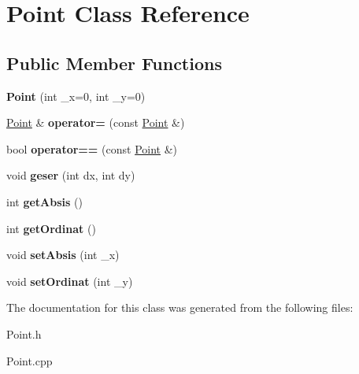 \hypertarget{class_point}{}\section{Point Class Reference}
\label{class_point}
\subsection*{Public Member Functions}
\begin{DoxyCompactItemize}
\item 
{\bfseries Point} (int \+\_\+x=0, int \+\_\+y=0)\hypertarget{class_point_adbd2637ceed85e28315d96c8208154a5}{}\label{class_point_adbd2637ceed85e28315d96c8208154a5}

\item 
\hyperlink{class_point}{Point} \& {\bfseries operator=} (const \hyperlink{class_point}{Point} \&)\hypertarget{class_point_a55eeab949e62268da63176d48570eb54}{}\label{class_point_a55eeab949e62268da63176d48570eb54}

\item 
bool {\bfseries operator==} (const \hyperlink{class_point}{Point} \&)\hypertarget{class_point_a9201e61e7884cb0f861f09639cb1c121}{}\label{class_point_a9201e61e7884cb0f861f09639cb1c121}

\item 
void {\bfseries geser} (int dx, int dy)\hypertarget{class_point_ad2432ee1f003f107b898243a1285a14b}{}\label{class_point_ad2432ee1f003f107b898243a1285a14b}

\item 
int {\bfseries get\+Absis} ()\hypertarget{class_point_ae33b5d39a797830928a7d38376b23d21}{}\label{class_point_ae33b5d39a797830928a7d38376b23d21}

\item 
int {\bfseries get\+Ordinat} ()\hypertarget{class_point_a23af70007db8db0ac9f74d1eafecdadc}{}\label{class_point_a23af70007db8db0ac9f74d1eafecdadc}

\item 
void {\bfseries set\+Absis} (int \+\_\+x)\hypertarget{class_point_add1782a8109328ad174a8bc829621011}{}\label{class_point_add1782a8109328ad174a8bc829621011}

\item 
void {\bfseries set\+Ordinat} (int \+\_\+y)\hypertarget{class_point_adcb07a7e64713bc497e5174b5bec6a10}{}\label{class_point_adcb07a7e64713bc497e5174b5bec6a10}

\end{DoxyCompactItemize}


The documentation for this class was generated from the following files\+:\begin{DoxyCompactItemize}
\item 
Point.\+h\item 
Point.\+cpp\end{DoxyCompactItemize}
